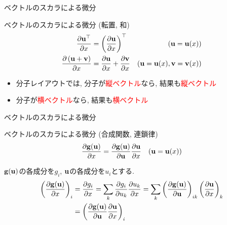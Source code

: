 \documentclass[dvipdfmx,notheorems,t]{beamer}
\begin{document}
\begin{frame}{ベクトルのスカラによる微分}
\begin{block}{ベクトルのスカラによる微分 (転置, 和)}
  \begin{align*}
    \pdv{\vb{u}^\top}{x} &= \left( \pdv{\vb{u}}{x} \right)^\top & \text{($\vb{u} = \vb{u}(x)$)} \\
    \pdv{\left( \vb{u} + \vb{v} \right)}{x} &= \pdv{\vb{u}}{x} + \pdv{\vb{v}}{x}
      & \text{($\vb{u} = \vb{u}(x), \vb{v} = \vb{v}(x)$)}
  \end{align*}
\end{block}

\begin{itemize}
  \item 分子レイアウトでは, 分子が\textcolor{red}{縦ベクトル}なら, 結果も\textcolor{red}{縦ベクトル}
  \item 分子が\textcolor{red}{横ベクトル}なら, 結果も\textcolor{red}{横ベクトル}
\end{itemize}
\end{frame}

\begin{frame}{ベクトルのスカラによる微分}
\begin{block}{ベクトルのスカラによる微分 (合成関数, 連鎖律)}
  \begin{align*}
    \pdv{\vb{g}(\vb{u})}{x} &= \pdv{\vb{g}(\vb{u})}{\vb{u}} \pdv{\vb{u}}{x}
      & \text{($\vb{u} = \vb{u}(x)$)}
  \end{align*}
\end{block}

$\vb{g}(\vb{u})$の各成分を$g_i$, $\vb{u}$の各成分を$u_i$とする.
\begin{align*}
  \left( \pdv{\vb{g}(\vb{u})}{x} \right)_i &= \pdv{g_i}{x}
    = \sum_k \pdv{g_i}{u_k} \pdv{u_k}{x}
    = \sum_k \left( \pdv{\vb{g}(\vb{u})}{\vb{u}} \right)_{ik} \left( \pdv{\vb{u}}{x} \right)_k \\
    &= \left( \pdv{\vb{g}(\vb{u})}{\vb{u}} \pdv{\vb{u}}{x} \right)_i
\end{align*}
\end{frame}
\end{document}
